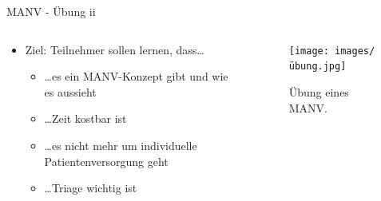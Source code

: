 \begin{frame}{MANV - Übung ii}
	\begin{columns}
		\begin{column}{0.7\textwidth}
			\begin{itemize}
				\item Ziel: Teilnehmer sollen lernen, dass\dots
				      \begin{itemize}
					      \item \dots es ein MANV-Konzept gibt und wie es aussieht
					      \item \dots Zeit kostbar ist
					      \item \dots es nicht mehr um individuelle Patientenversorgung geht
					      \item \dots Triage wichtig ist
				      \end{itemize}
			\end{itemize}
		\end{column}
		\begin{column}{0.3\textwidth}
			\begin{figure}
				\begin{center}
					\texttt{[image: images/übung.jpg]}
				\end{center}
				\caption{Übung eines MANV.\cite{manv1übung}}\label{fig:übung}
			\end{figure}
		\end{column}
	\end{columns}
\end{frame}
